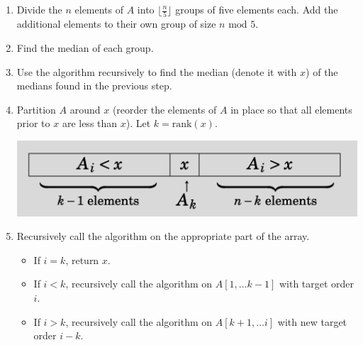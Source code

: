 \documentclass{beamer}
\begin{document}
\begin{frame}
    \scriptsize
    \begin{enumerate}
        \item Divide the $n$ elements of $A$ into $\lfloor \frac{n}{5}\rfloor$ groups of five elements each. Add the additional elements to their own group of size $n \text{ mod } 5$. 
        \item Find the median of each group. 
        \item Use the algorithm recursively to find the median (denote it with $x$) of the medians found in the previous step. 
        \item Partition $A$ around $x$ (reorder the elements of $A$ in place so that all elements prior to $x$ are less than $x$). Let $k = \text{rank}(x)$.
        \begin{center}
            \includegraphics[scale=0.3]{figures/qs_diagram.png}
        \end{center}
        \item Recursively call the algorithm on the appropriate part of the array. 
        \begin{itemize}
            \scriptsize
            \item If $i = k$, return $x$. 
            \item If $i < k$, recursively call the algorithm on $A[1, \dots k-1]$ with target order $i$.
            \item If $i > k$, recursively call the algorithm on $A[k + 1, \dots i]$ with new target order $i - k$. 
        \end{itemize}
    \end{enumerate}
\end{frame}
\end{document}
